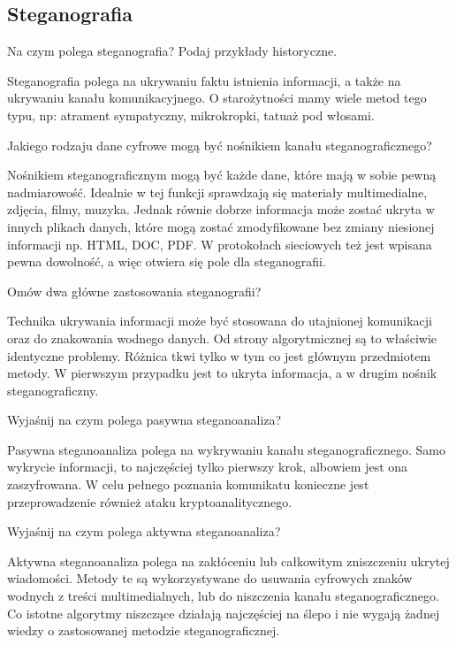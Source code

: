 \documentclass[answers,11pt]{exam}
\begin{document}
\subsection{Steganografia}

\begin{questions}

\question Na czym polega steganografia? Podaj przykłady historyczne.
\begin{solution}
Steganografia polega na ukrywaniu faktu istnienia informacji, a także na ukrywaniu kanału komunikacyjnego. O starożytności mamy wiele metod tego typu, np: atrament sympatyczny, mikrokropki, tatuaż pod włosami.
\end{solution}

\question Jakiego rodzaju dane cyfrowe mogą być nośnikiem kanału steganograficznego?
\begin{solution}
Nośnikiem steganograficznym mogą być każde dane, które mają w sobie pewną nadmiarowość. Idealnie w tej funkcji sprawdzają się materiały multimedialne, zdjęcia, filmy, muzyka. Jednak równie dobrze informacja może zostać ukryta w innych plikach danych, które mogą zostać zmodyfikowane bez zmiany niesionej informacji np. HTML, DOC, PDF. W protokołach sieciowych też jest wpisana pewna dowolność, a więc otwiera się pole dla steganografii. 
\end{solution}

\question Omów dwa główne zastosowania steganografii?
\begin{solution}
Technika ukrywania informacji może być stosowana do utajnionej komunikacji oraz do znakowania wodnego danych. Od strony algorytmicznej są to właściwie identyczne problemy. Różnica tkwi tylko w tym co jest głównym przedmiotem metody. W pierwszym przypadku jest to ukryta informacja, a w drugim nośnik steganograficzny. 
\end{solution}

\question Wyjaśnij na czym polega pasywna steganoanaliza?
\begin{solution}
Pasywna steganoanaliza polega na wykrywaniu kanału steganograficznego. Samo wykrycie informacji, to najczęściej tylko pierwszy krok, albowiem jest ona zaszyfrowana. W celu pełnego poznania komunikatu konieczne jest przeprowadzenie również ataku kryptoanalitycznego.
\end{solution}

\question Wyjaśnij na czym polega aktywna steganoanaliza?
\begin{solution}
Aktywna steganoanaliza polega na zakłóceniu lub całkowitym zniszczeniu ukrytej wiadomości. Metody te są wykorzystywane do usuwania cyfrowych znaków wodnych z treści multimedialnych, lub do niszczenia kanału steganograficznego. Co istotne algorytmy niszczące działają najczęściej na ślepo i nie wygają żadnej wiedzy o zastosowanej metodzie steganograficznej.  
\end{solution}


\end{questions}
\end{document}
